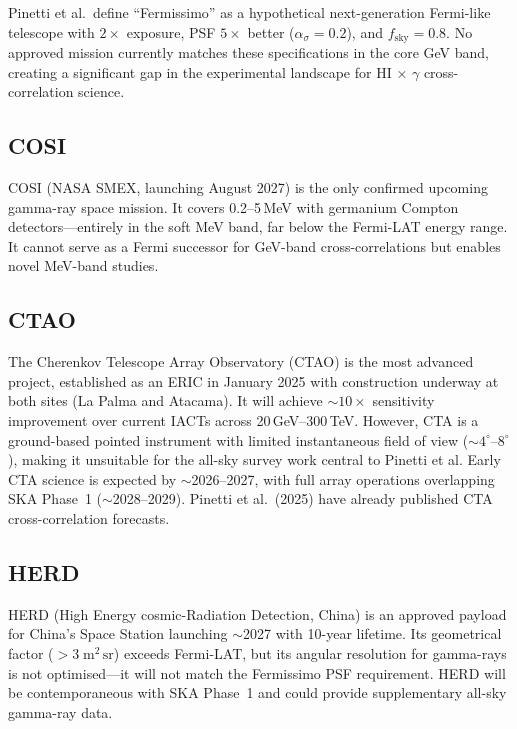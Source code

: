 \documentclass[10pt,a4paper]{article}
\newcommand{\fsky}{f_{\mathrm{sky}}}
\begin{document}
Pinetti et al.\ define ``Fermissimo'' as a hypothetical next-generation Fermi-like telescope with $2\times$ exposure, PSF $5\times$ better ($\alpha_\sigma = 0.2$), and $\fsky = 0.8$. No approved mission currently matches these specifications in the core GeV band, creating a significant gap in the experimental landscape for HI$\,\times\,\gamma$ cross-correlation science.

\subsection{COSI}

COSI (NASA SMEX, launching August 2027) is the only confirmed upcoming gamma-ray space mission. It covers 0.2--5\,MeV with germanium Compton detectors---entirely in the soft MeV band, far below the Fermi-LAT energy range. It cannot serve as a Fermi successor for GeV-band cross-correlations but enables novel MeV-band studies.

\subsection{CTAO}

The Cherenkov Telescope Array Observatory (CTAO) is the most advanced project, established as an ERIC in January 2025 with construction underway at both sites (La Palma and Atacama). It will achieve $\sim10\times$ sensitivity improvement over current IACTs across 20\,GeV--300\,TeV. However, CTA is a ground-based pointed instrument with limited instantaneous field of view ($\sim4^\circ$--$8^\circ$), making it unsuitable for the all-sky survey work central to Pinetti et al. Early CTA science is expected by $\sim$2026--2027, with full array operations overlapping SKA Phase~1 ($\sim$2028--2029). Pinetti et al.\ (2025) have already published CTA cross-correlation forecasts.

\subsection{HERD}

HERD (High Energy cosmic-Radiation Detection, China) is an approved payload for China's Space Station launching $\sim$2027 with 10-year lifetime. Its geometrical factor ($>3\;\mathrm{m^2\,sr}$) exceeds Fermi-LAT, but its angular resolution for gamma-rays is not optimised---it will not match the Fermissimo PSF requirement. HERD will be contemporaneous with SKA Phase~1 and could provide supplementary all-sky gamma-ray data.
\end{document}
